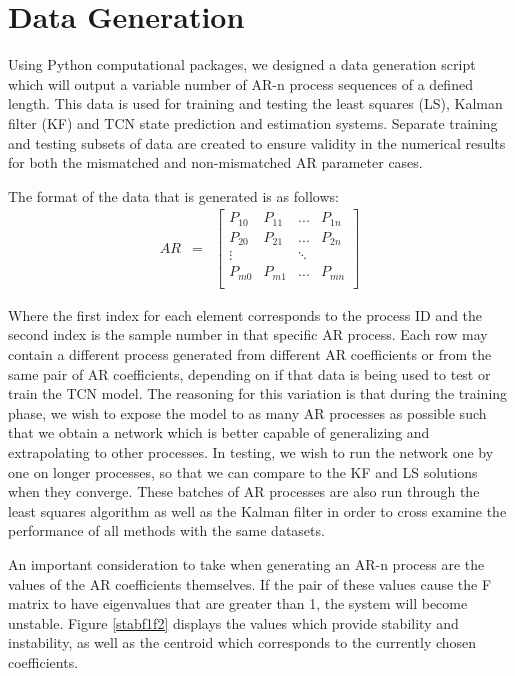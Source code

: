 \documentclass[twocolumn,letterpaper]{IEEEAerospaceCLS}  %
\begin{document}
\section{Data Generation}

\label{sec:dgen}

Using Python computational packages, we designed a data generation script which will output a variable number of AR-n process sequences of a defined length. This data is used for training and testing the least squares (LS), Kalman filter (KF) and TCN state prediction and estimation systems. Separate training and testing subsets of data are created to ensure validity in the numerical results for both the mismatched and non-mismatched AR parameter cases.

The format of the data that is generated is as follows: 
\begin{eqnarray*}
AR&=&\begin{bmatrix} 
P_{10} & P_{11} & ... & P_{1n} \\
P_{20} & P_{21} & ... & P_{2n} \\
\vdots &  & \ddots &  \\
P_{m0} & P_{m1} & ... & P_{mn} \\
\end{bmatrix}
\end{eqnarray*}

Where the first index for each element corresponds to the process ID and the second index is the sample number in that specific AR process. Each row may contain a different process generated from different AR coefficients or from the same pair of AR coefficients, depending on if that data is being used to test or train the TCN model. The reasoning for this variation is that during the training phase, we wish to expose the model to as many AR processes as possible such that we obtain a network which is better capable of generalizing and extrapolating to other processes. In testing, we wish to run the network one by one on longer processes, so that we can compare to the KF and LS solutions when they converge. These batches of AR processes are also run through the least squares algorithm as well as the Kalman filter in order to cross examine the performance of all methods with the same datasets. 

An important consideration to take when generating an AR-n process are the values of the AR coefficients themselves. If the pair of these values cause the F matrix to have eigenvalues that are greater than 1, the system will become unstable. Figure \ref{stabf1f2} displays the values which provide stability and instability, as well as the centroid which corresponds to the currently chosen coefficients.
\end{document}
